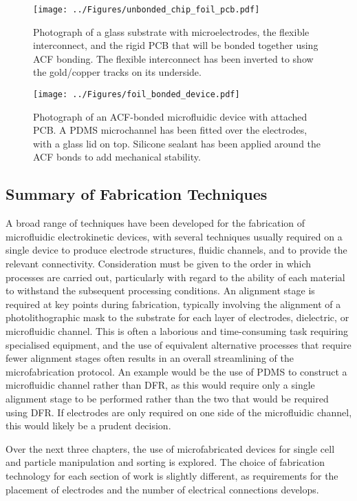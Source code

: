 \begin{figure}
	\centering
		\texttt{[image: ../Figures/unbonded\_chip\_foil\_pcb.pdf]}
	\caption[Bonding parameters for ACF tape.]{Photograph of a glass substrate with microelectrodes, the flexible interconnect, and the rigid PCB that will be bonded together using ACF bonding. The flexible interconnect has been inverted to show the gold/copper tracks on its underside.}
	\label{fig:unbonded_chip_foil_pcb}
\end{figure}

\begin{figure}
	\centering
		\texttt{[image: ../Figures/foil\_bonded\_device.pdf]}
	\caption[ACF-bonded microfluidic device with attached PCB.]{Photograph of an ACF-bonded microfluidic device with attached PCB. A PDMS microchannel has been fitted over the electrodes, with a glass lid on top. Silicone sealant has been applied around the ACF bonds to add mechanical stability.}
	\label{fig:foil_bonded_device}
\end{figure}

\subsection{Summary of Fabrication Techniques}

A broad range of techniques have been developed for the fabrication of microfluidic electrokinetic devices, with several techniques usually required on a single device to produce electrode structures, fluidic channels, and to provide the relevant connectivity. Consideration must be given to the order in which processes are carried out, particularly with regard to the ability of each material to withstand the subsequent processing conditions. An alignment stage is required at key points during fabrication, typically involving the alignment of a photolithographic mask to the substrate for each layer of electrodes, dielectric, or microfluidic channel. This is often a laborious and time-consuming task requiring specialised equipment, and the use of equivalent alternative processes that require fewer alignment stages often results in an overall streamlining of the microfabrication protocol. An example would be the use of PDMS to construct a microfluidic channel rather than DFR, as this would require only a single alignment stage to be performed rather than the two that would be required using DFR. If electrodes are only required on one side of the microfluidic channel, this would likely be a prudent decision. 

Over the next three chapters, the use of microfabricated devices for single cell and particle manipulation and sorting is explored. The choice of fabrication technology for each section of work is slightly different, as requirements for the placement of electrodes and the number of electrical connections develops.